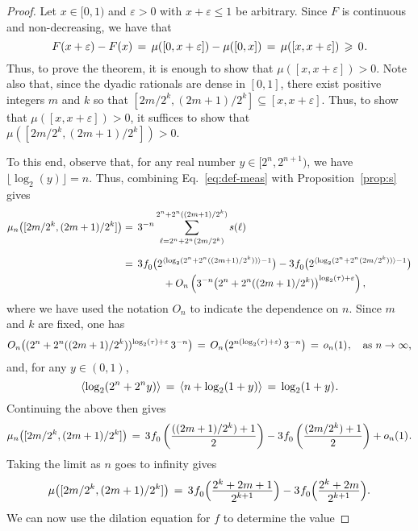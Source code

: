 \documentclass[11pt,a4paper]{amsart}
\theoremstyle{plain}
\theoremstyle{definition}
\numberwithin{equation}{section}
\newcommand{\ts}{\hspace{0.5pt}}
\newcommand{\myfrac}[2]{\frac{\raisebox{-2pt}{$#1$}}
      {\raisebox{0.5pt}{$#2$}}}
\begin{document}
\begin{proof} 
  Let $x\in [0,1)$ and $\varepsilon>0$ with $x+\varepsilon\leqslant 1$
  be arbitrary. Since $F$ is continuous and non-decreasing, we have
  that
\[
   F(x+\varepsilon)-F(x) \, = \, \mu([0,x+\varepsilon])-\mu([0,x])
   \, = \, \mu([x,x+\varepsilon]) \, \geqslant \, 0 \ts .
\]
Thus, to prove the theorem, it is enough to show that
$\mu([x,x+\varepsilon]) > 0$. Note also that, since the dyadic
rationals are dense in $[0,1]$, there exist positive integers $m$ and
$k$ so that $[2m/2^k, (2m+1)/2^k]\subseteq [x,x+\varepsilon]$. Thus,
to show that $\mu([x,x+\varepsilon]) > 0$, it suffices to show that
$\mu([2m/2^k, (2m+1)/2^k]) > 0$.

To this end, observe that, for any real number $y\in[2^n,2^{n+1})$, we
have $\lfloor \log_2 (y) \rfloor =n$. Thus, combining
Eq.~\eqref{eq:def-meas} with Proposition~\ref{prop:s} gives
\begin{align*}
  \mu_n \bigl( [2m/2^k, (2m+1)/2^k] \bigr) & = \, 
   3^{-n} \sum_{\ell=2^n+2^n(2m/2^k)}^{2^n +2^n((2m+1)/2^k)} s(\ell)\\[2mm]
   & = \, 3 \ts f^{}_{0} 
     \big(2^{\langle \log_2 (2^n +2^n((2m+1)/2^k))\rangle-1}\big) -
     3\ts f^{}_{0}\big(2^{\langle \log_2 (2^n+2^n(2m/2^k))\rangle-1}\big)\\
   &\qquad\qquad + O_n \left( 3^{-n} \bigl(
     2^n +2^n((2m+1)/2^k) \bigr)^{\log_2 (\tau)
          +\varepsilon} \right) ,
\end{align*} 
where we have used the notation $O_n$ to indicate the dependence on
$n$. Since $m$ and $k$ are fixed, one has
\[
    O_n \big((2^n +2^n((2m+1)/2^k))^{\log_2 (\tau)
    +\varepsilon}\, 3^{-n}\big) \, = \, O_n\big(2^{n(\log_2 (\tau)
    +\varepsilon)}\, 3^{-n}\big) \, = \, o_n(1) \ts , \quad
    \text{as $n \to\infty$,}
\]
and, for any $y\in(0,1)$,
\[
  \langle \log_2 (2^n+2^ny)\rangle \, = \,
    \langle n+\log_2 (1+y)\rangle
   \, = \, \log_2 (1+y) \ts .
\]
Continuing the above then gives 
\[
   \mu_n \bigl( [2m/2^k, (2m+1)/2^k ] \bigr) \, = \, 3\ts
    f^{}_{0} \left(\frac{((2m+1)/2^k)+1}{2}\right) - 
     3\ts f^{}_{0} \left(\frac{(2m/2^k)+1}{2}\right) + o_n(1) \ts .
\]
Taking the limit as $n$ goes to infinity gives
\begin{equation}\label{eq:fdiffm}
   \mu \bigl( [2m/2^k, (2m+1)/2^k ] \bigr) \, = \,
   3\ts f^{}_{0} \Bigl(\myfrac{2^k+2m+1}{2^{k+1}}\Bigr)-
   3\ts f^{}_{0} \Bigl(\myfrac{2^k+2m}{2^{k+1}}\Bigr).
\end{equation}
We can now use the dilation equation for ${f}$ to determine the value

\end{proof}
\end{document}

